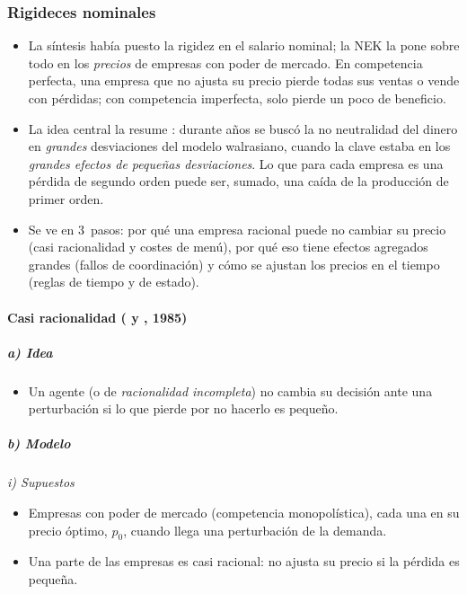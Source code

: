\documentclass[11pt]{article}
\begin{document}
\subsubsection{Rigideces nominales}\label{sec:rigideces-nominales}

\begin{itemize}
\item La síntesis había puesto la rigidez en el salario nominal; la NEK la pone sobre todo en los \emph{precios} de empresas con poder de mercado. En competencia perfecta, una empresa que no ajusta su precio pierde todas sus ventas o vende con pérdidas; con competencia imperfecta, solo pierde un poco de beneficio.
\item La idea central la resume \textcite{Romer1993New}: durante años se buscó la no neutralidad del dinero en \emph{grandes} desviaciones del modelo walrasiano, cuando la clave estaba en los \emph{grandes efectos de pequeñas desviaciones}. Lo que para cada empresa es una pérdida de segundo orden puede ser, sumado, una caída de la producción de primer orden.
\item Se ve en 3~pasos: por qué una empresa racional puede no cambiar su precio (casi racionalidad y costes de menú), por qué eso tiene efectos agregados grandes (fallos de coordinación) y cómo se ajustan los precios en el tiempo (reglas de tiempo y de estado).
\end{itemize}

\paragraph{Casi racionalidad ( y , 1985)}

\subparagraph{a) Idea}

\begin{itemize}
\item Un agente  (o de \emph{racionalidad incompleta}) no cambia su decisión ante una perturbación si lo que pierde por no hacerlo es pequeño\nocite{AkerlofYellen1985NearRational,AkerlofYellen1985Small}.
\end{itemize}

\subparagraph{b) Modelo}

\hspace*{3.6em}\emph{i) Supuestos}

\begin{itemize}
\item Empresas con poder de mercado (competencia monopolística), cada una en su precio óptimo, $p_0$, cuando llega una perturbación de la demanda.
\item Una parte de las empresas es casi racional: no ajusta su precio si la pérdida es pequeña.
\end{itemize}
\end{document}
